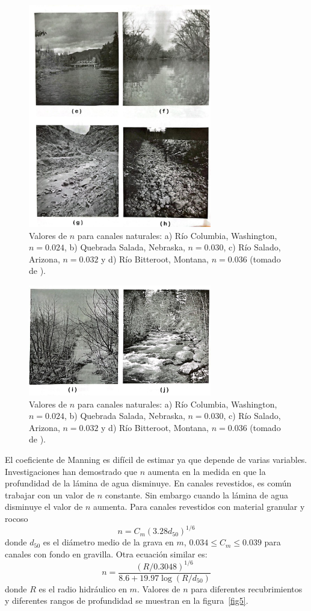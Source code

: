 \documentclass[11pt, oneside]{article}
\begin{document}
\begin{figure}[h]
\centering
\includegraphics[width=8cm]{fig442.jpeg}
\caption{Valores de $n$ para canales naturales: a) R\'io Columbia, Washington, $n=0.024$, b) Quebrada Salada, Nebraska, $n=0.030$, c) R\'io Salado, Arizona, $n=0.032$ y d) R\'io Bitteroot, Montana, $n=0.036$  (tomado de \cite{Chau}).}
\label{fig4}
\end{figure}

\begin{figure}[h]
\centering
\includegraphics[width=8cm]{fig443.jpeg}
\caption{Valores de $n$ para canales naturales: a) R\'io Columbia, Washington, $n=0.024$, b) Quebrada Salada, Nebraska, $n=0.030$, c) R\'io Salado, Arizona, $n=0.032$ y d) R\'io Bitteroot, Montana, $n=0.036$  (tomado de \cite{Chau}).}
\label{fig4}
\end{figure}

El coeficiente de Manning es dif\'icil de estimar ya que depende de varias variables. Investigaciones han demostrado que $n$ aumenta en la medida en que la profundidad de la l\'amina de agua disminuye. En canales revestidos, es com\'un trabajar con un valor de $n$ constante. Sin embargo cuando la l\'amina de agua disminuye el valor de $n$ aumenta. Para canales revestidos con material granular y rocoso 
$$
n=C_m \left( 3.28 d_{50} \right)^{1/6} 
$$
donde $d_{50}$ es el diámetro medio de la grava en $m$, $0.034 \leq C_m \leq 0.039$ para canales con fondo en gravilla. Otra ecuaci\'on  similar es:
$$
n = \frac{\left( R/0.3048 \right)^{1/6}}{8.6 + 19.97 \log \left( R/d_{50} \right)} 
$$
donde $R$ es el radio hidr\'aulico en $m$. Valores de $n$ para diferentes recubrimientos y diferentes rangos de profundidad se muestran en la figura~\ref{fig5}.
\end{document}
